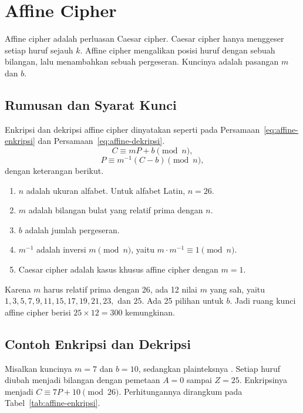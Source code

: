 \section{Affine Cipher}
\label{sec:affine}

Affine cipher adalah perluasan Caesar cipher. Caesar cipher hanya menggeser
setiap huruf sejauh $k$. Affine cipher mengalikan posisi huruf dengan sebuah
bilangan, lalu menambahkan sebuah pergeseran. Kuncinya adalah pasangan $m$ dan
$b$.

\subsection{Rumusan dan Syarat Kunci}
\label{sec:affine-rumusan}

Enkripsi dan dekripsi affine cipher dinyatakan seperti pada
Persamaan~\ref{eq:affine-enkripsi} dan Persamaan~\ref{eq:affine-dekripsi}.
\begin{equation}
    C \equiv mP + b \pmod{n},
    \label{eq:affine-enkripsi}
\end{equation}
\begin{equation}
    P \equiv m^{-1}(C - b) \pmod{n},
    \label{eq:affine-dekripsi}
\end{equation}
dengan keterangan berikut.
\begin{enumerate}
    \item $n$ adalah ukuran alfabet. Untuk alfabet Latin, $n=26$.
    \item $m$ adalah bilangan bulat yang relatif prima dengan $n$.
    \item $b$ adalah jumlah pergeseran.
    \item $m^{-1}$ adalah inversi $m \pmod{n}$, yaitu
          $m \cdot m^{-1} \equiv 1 \pmod{n}$.
    \item Caesar cipher adalah kasus khusus affine cipher dengan $m=1$.
\end{enumerate}

Karena $m$ harus relatif prima dengan 26, ada 12 nilai $m$ yang sah, yaitu
$1,3,5,7,9,11,15,17,19,21,23,$ dan $25$. Ada 25 pilihan untuk $b$. Jadi ruang
kunci affine cipher berisi $25 \times 12 = 300$ kemungkinan.

\subsection{Contoh Enkripsi dan Dekripsi}
\label{sec:affine-contoh}

Misalkan kuncinya $m=7$ dan $b=10$, sedangkan plainteksnya .
Setiap huruf diubah menjadi bilangan dengan pemetaan $A=0$ sampai $Z=25$.
Enkripsinya menjadi $C \equiv 7P+10 \pmod{26}$. Perhitungannya dirangkum pada
Tabel~\ref{tab:affine-enkripsi}.

